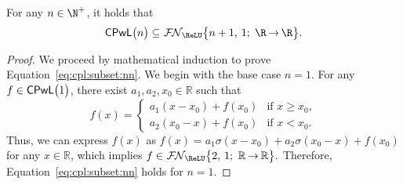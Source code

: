 \documentclass[11pt,a4paper]{article}
\begin{document}
\begin{lemma}\label{lem:cpwl(n):in:nn}
	For any $n\in \N^+$, it holds that
	\begin{equation}\label{eq:cpl:subset:nn}
		\cpl\big(n\big)\subseteq  \nn[\big]{\ReLU}{n+1}{1}{\R}{\R}.
	\end{equation}
\end{lemma}
\begin{proof}%
We proceed by mathematical induction to prove Equation~\eqref{eq:cpl:subset:nn}. We begin with the base case \( n = 1 \).
For any \( f \in \cpl\big(1\big) \), there exist \( a_1, a_2, x_0 \in \mathbb{R} \) such that
\begin{equation*}
    f(x) = 
    \begin{cases}
                a_1(x - x_0) + f(x_0)  & \text{if } x \ge x_0,\\
        a_2(x_0 - x) + f(x_0)  & \text{if } x < x_0.
    \end{cases}
\end{equation*}
Thus, we can express \( f(x) \) as \( f(x) = a_1 \sigma(x - x_0) + a_2 \sigma(x_0 - x) + f(x_0) \) for any \( x \in \mathbb{R} \), which implies
\(f \in \nn[\big]{\ReLU}{2}{1}{\mathbb{R}}{\mathbb{R}}.\)
Therefore, Equation~\eqref{eq:cpl:subset:nn} holds for \( n = 1 \).


\end{proof}
\end{document}
